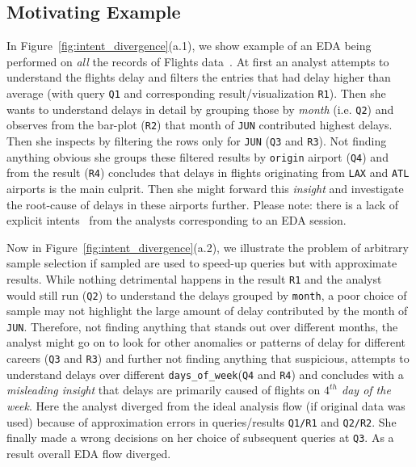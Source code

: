 \subsection{Motivating Example}


In Figure~\ref{fig:intent_divergence}(a.1), we show example of an EDA being performed on \textit{all} the records of Flights data~\cite{Flights}. At first an analyst attempts to understand the flights delay and filters the entries that had delay higher than average (with query \texttt{Q1} and corresponding result/visualization \texttt{R1}). 
Then she wants to understand delays in detail by grouping those by \textit{month} (i.e. \texttt{Q2}) and observes from the bar-plot (\texttt{R2}) that month of \texttt{JUN} contributed highest delays.
Then she inspects by filtering the rows only for \texttt{JUN} (\texttt{Q3} and \texttt{R3}). Not finding anything obvious she groups these filtered results by \texttt{origin} airport (\texttt{Q4}) and from the result (\texttt{R4}) concludes that delays in flights originating from \texttt{LAX} and \texttt{ATL} airports is the main culprit. Then she might forward this \textit{insight} and investigate the root-cause of delays in these airports further. 
Please note: there is a lack of explicit intents~\cite{milo2020automating, ma2021metainsight} from the analysts corresponding to an EDA session.

Now in Figure~\ref{fig:intent_divergence}(a.2), we illustrate the problem of arbitrary sample selection if sampled are used to speed-up queries but with approximate results.
While nothing detrimental happens in the result \texttt{R1} and the analyst would still run (\texttt{Q2}) to understand the delays grouped by \texttt{month}, a poor choice of sample may not highlight the large amount of delay contributed by the month of
\texttt{JUN}. 
Therefore, not finding anything that stands out over different months, the analyst might go on to look for other anomalies or patterns of delay for different careers (\texttt{Q3} and \texttt{R3}) and further not finding anything that suspicious, attempts to understand delays over different \texttt{days\_of\_week}(\texttt{Q4} and \texttt{R4}) and concludes with a \textit{misleading insight} that delays are primarily caused of flights on \textit{$4^{th}$ day of the week}.
%
Here the analyst diverged from the ideal analysis flow (if original data was used) because of approximation errors in queries/results \texttt{Q1/R1} and \texttt{Q2/R2}. 
She finally made a wrong decisions on her choice of subsequent queries at \texttt{Q3}.   
As a result overall EDA flow diverged. 

